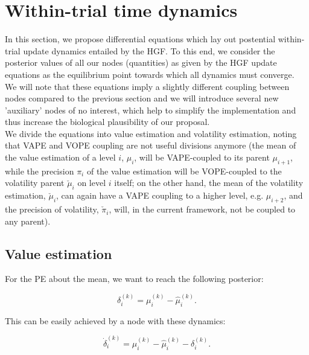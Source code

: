 \section{Within-trial time dynamics}

In this section, we propose differential equations which lay out postential within-trial update dynamics entailed by the HGF. To this end, we consider the posterior values of all our nodes (quantities) as given by the HGF update equations as the equilibrium point towards which all dynamics must converge. \\

We will note that these equations imply a slightly different coupling between nodes compared to the previous section and we will introduce several new 'auxiliary' nodes of no interest, which help to simplify the implementation and thus increase the biological plausibility of our proposal.\\

We divide the equations into \textsf{value} estimation and \textsf{volatility} estimation, noting that \textsf{VAPE} and \textsf{VOPE} coupling are not useful divisions anymore (the mean of the value estimation of a level $i$, $\mu_i$, will be \textsf{VAPE}-coupled to its parent $\mu_{i+1}$, while the precision $\pi_i$ of the value estimation will be \textsf{VOPE}-coupled to the volatility parent $\check{\mu}_i$ on level $i$ itself; on the other hand, the mean of the volatility estimation, $\check{\mu}_i$, can again have a \textsf{VAPE} coupling to a higher level, e.g. $\mu_{i+2}$, and the precision of volatility, $\check{\pi}_i$, will, in the current framework, not be coupled to any parent).

\subsection{Value estimation}

For the \textsf{PE} about the mean, we want to reach the following posterior:

\begin{equation}
	\delta_i^{(k)} = \mu_i^{(k)} - \hat{\mu}_i^{(k)}.
\end{equation}

This can be easily achieved by a node with these dynamics:

\begin{equation}
	\dot{\delta}_i^{(k)} = \mu_i^{(k)} - \hat{\mu}_i^{(k)} - \delta_i^{(k)}.
\end{equation}

